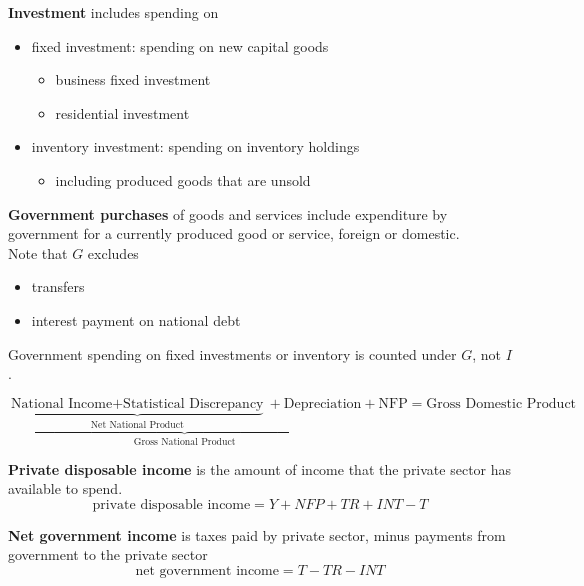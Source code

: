 \documentclass[letterpaper, 9pt,landscape]{extarticle}
\begin{document}
\begin{multicols*}{5}
\textbf{Investment} includes spending on
\begin{itemize}
    \item fixed investment: spending on new capital goods
    \begin{itemize}
        \item business fixed investment
        \item residential investment
    \end{itemize} 
    \item inventory investment: spending on inventory holdings
    \begin{itemize}
        \item including produced goods that are unsold
    \end{itemize} 
\end{itemize} 

\textbf{Government purchases} of goods and services include expenditure by government for a currently produced good or service, foreign or domestic. \\

Note that $G$ excludes
\begin{itemize}
    \item transfers 
    \item interest payment on national debt
\end{itemize} 

Government spending on fixed investments or inventory is counted under $G$, not $I$.

\begin{remark}

\[
\underbrace{
\underbrace{
    \text{National Income}
    + \text{Statistical Discrepancy}
}_{\text{Net National Product}}
+ \text{Depreciation}
}_{\text{Gross National Product}}
+ \text{NFP}
= \text{Gross Domestic Product}
\]
\end{remark}

\begin{definition}
    \textbf{Private disposable income} is the amount of income that the private sector has available to spend.
    \[
        \text{private disposable income} = Y + NFP + TR + INT - T
    \]
\end{definition}

\begin{definition}
    \textbf{Net government income} is taxes paid by private sector, minus payments from government to the private sector 
    \[
        \text{net government income} = T - TR - INT
    \]
\end{definition}


\end{multicols*}
\end{document}
